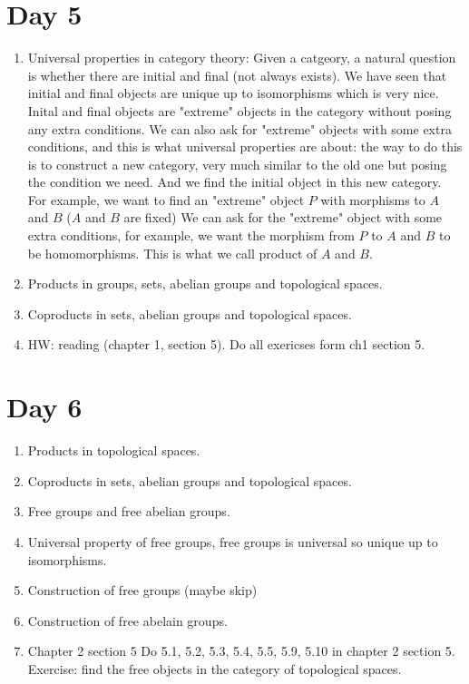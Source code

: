 \documentclass[12pt]{scrartcl}
\begin{document}
\section{Day 5}
\begin{enumerate}
    \item Universal properties in category theory: Given a catgeory, a natural question is whether there are initial and final (not always exists). We have seen that initial and final objects are unique up to isomorphisms which is very nice. Inital and final objects are "extreme" objects in the category without posing any extra conditions. We can also ask for "extreme" objects with some extra conditions, and this is what universal properties are about: the way to do this is to construct a new category, very much similar to the old one but posing the condition we need. And we find the initial object in this new category. For example, we want to find an "extreme" object $P$ with morphisms to $A$ and $B$ ($A$ and $B$ are fixed) We can ask for the "extreme" object with some extra conditions, for example, we want the morphism from $P$ to $A$ and $B$ to be homomorphisms. This is what we call product of $A$ and $B$.  
    \item Products in groups, sets, abelian groups and topological spaces.
    \item Coproducts in sets, abelian groups and topological spaces. 
    \item HW: reading (chapter 1, section 5). Do all exericses form ch1 section 5. 
\end{enumerate}
\section{Day 6}

\begin{enumerate}
    \item Products in topological spaces.
    \item Coproducts in sets, abelian groups and topological spaces. 
    \item Free groups and free abelian groups. 
    \item Universal property of free groups, free groups is universal so unique up to isomorphisms.
    \item Construction of free groups (maybe skip)
    \item Construction of free abelain groups. 
    \item Chapter 2 section 5 Do 5.1, 5.2, 5.3, 5.4, 5.5, 5.9, 5.10 in chapter 2 section 5. Exercise: find the free objects in the category of topological spaces. 
\end{enumerate}
\end{document}

